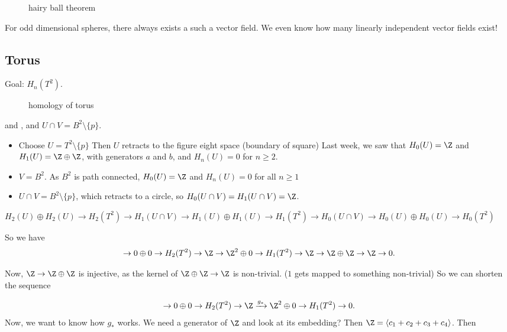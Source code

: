 \begin{figure}[H]
    \centering
    \caption{hairy ball theorem}
    \label{fig:hairy-ball-theorem}
\end{figure}
\begin{remark}
    For odd dimensional spheres, there always exists a such a vector field.
    We even know how many linearly independent vector fields exist!
\end{remark}

\hr


\subsection*{Torus}
Goal: $H_n(T^2)$.

\begin{figure}[H]
    \centering
    \caption{homology of torus}
    \label{fig:homology-of-torus}
\end{figure}

 and , and $U \cap V = B^2 \setminus \{ p\} $.

\begin{itemize}
    \item Choose $U = T^2 \setminus \{p\} $
        Then $U$ retracts to the figure eight space (boundary of square)
        Last week, we saw that $H_0(U) = \Z$ and $H_1(U) = \Z \oplus \Z$, with generators $a$ and $b$, and $H_n(U) = 0$ for $n \ge 2$.
    \item  $V = B^2$. As $B^2$ is path connected, $H_0(U) = \Z $ and $H_n(U) = 0$ for all  $n \ge  1$
    \item $U \cap  V = B^2 \setminus \{ p\} $, which retracts to a circle, so $H_0(U \cap V) = H_1(U \cap  V) = \Z$.
\end{itemize}

\centerline{$
            H_2(U) \oplus H_2(U) \to  H_2(T^2) \to  H_1(U \cap V) \to  H_1(U) \oplus H_1(U) \to  H_1(T^2) \to  H_0(U \cap  V) \to  H_0(U) \oplus H_0(U) \to  H_0(T^2)
        $}
    So we have
    \[
        \to  0 \oplus 0 \to  H_2(T^2) \to  \Z \to  \Z^2 \oplus 0 \to  H_1(T^2) \to  \Z \to  \Z \oplus \Z \to  \Z \to  0
    .\] 

    Now, $\Z \to \Z \oplus \Z$ is injective, as the kernel of $\Z\oplus \Z \to  \Z$ is non-trivial. ($1$ gets mapped to something non-trivial)
    So we can shorten the sequence

    \[
        \to  0 \oplus 0 \to  H_2(T^2) \to  \Z \xrightarrow{g_*}   \Z^2 \oplus 0 \to  H_1(T^2) \to  0
    .\] 
    Now, we want to know how $g_*$ works.
    We need a generator of $\Z$ and look at its embedding?
    Then $\Z = \left<c_1 + c_2 + c_3 + c_4 \right>$.
    Then

